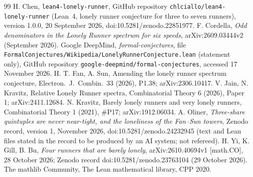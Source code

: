 \documentclass[11pt]{article}
\theoremstyle{remark}
\begin{document}
\begin{thebibliography}{99}
 H. Chen, \texttt{lean4-lonely-runner}, GitHub repository \texttt{chlciallo/lean4-lonely-runner} (Lean~4, lonely runner conjecture for three to seven runners), version 1.0.0, 20 September 2026, doi:10.5281/zenodo.22851977.
 F. Cordella, \emph{Odd denominators in the Lonely Runner spectrum for six speeds}, arXiv:2609.03444v2 (September 2026).
 Google DeepMind, \emph{formal-conjectures}, file \texttt{FormalConjectures/Wikipedia/\allowbreak LonelyRunnerConjecture.lean} (statement only), GitHub repository \texttt{google-deepmind/formal-conjectures}, accessed 17 November 2026.
 H. T. Fan, A. Sun, Amending the lonely runner spectrum conjecture, Electron.\ J.\ Combin.\ 33 (2026), P1.38; arXiv:2306.10417.
 V. Jain, N. Kravitz, Relative Lonely Runner spectra, Combinatorial Theory 6 (2026), Paper 1; arXiv:2411.12684.
 N. Kravitz, Barely lonely runners and very lonely runners, Combinatorial Theory 1 (2021), \#P17; arXiv:1912.06034.
 A. Oliner, \emph{Three-share quintuples are never near-tight, and the loneliness of the Fan--Sun towers}, Zenodo record, version 1, November 2026, doi:10.5281/zenodo.24232945 (text and Lean files stated in the record to be produced by an AI system; not refereed).
 H. Yi, K. Gill, B. Bu, \emph{Four runners that are barely lonely}, arXiv:2610.40694v1 [math.CO], 28 October 2026; Zenodo record doi:10.5281/zenodo.23763104 (29 October 2026).
 The mathlib Community, The Lean mathematical library, CPP 2020.
\end{thebibliography}
\end{document}

